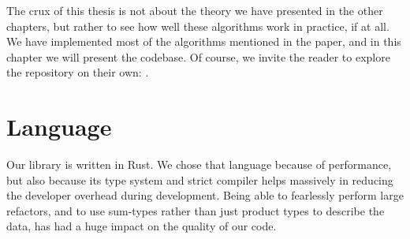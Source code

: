 The crux of this thesis is not about the theory we have presented in the other chapters, but rather to see how well these algorithms work in practice, if at all. We have implemented most of the algorithms mentioned in the paper, and in this chapter we will present the codebase. Of course, we invite the reader to explore the repository on their own: \cite{source:codebase}.

\section{Language}
Our library is written in Rust. We chose that language because of performance, but also because its type system and strict compiler helps massively in reducing the developer overhead during development. Being able to fearlessly perform large refactors, and to use sum-types rather than just product types to describe the data, has had a huge impact on the quality of our code. 